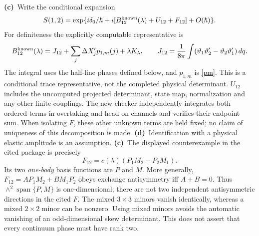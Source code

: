 \documentclass[11pt,a4paper]{article}
\newcommand{\C}{\textbf{(c)}\ }
\newcommand{\D}{\textbf{(d)}\ }
\begin{document}
\C Write the conditional expansion
\begin{equation}
 S(1,2)=\exp\{i\delta_0/\hbar+i[B_{12}^{\rm known}(\lambda)
                      +U_{12}+F_{12}]+O(\hbar)\}.\label{S}
\end{equation}
For definiteness the explicitly computable representative is
\begin{equation}
 B_{12}^{\rm known}(\lambda)=J_{12}
             +\sum_j\Delta X'_j p_{1,m}(j)+\lambda K_\lambda,\qquad
 J_{12}=\frac1{8\pi}\int(\vartheta_1\vartheta'_2-
                             \vartheta_2\vartheta'_1)\,dq.\label{knownbulk}
\end{equation}
The integral uses the half-line phases defined below, and $p_{1,m}$ is
\eqref{pm}. This is a conditional trace representative, not the completed
physical determinant. $U_{12}$ includes the uncomputed projected determinant,
state map, normalization and any other finite couplings. The new checker
independently integrates both ordered terms in overtaking and head-on
channels and verifies their endpoint sum. When isolating $F$, these other
unknown terms are held fixed; no claim of uniqueness of this decomposition
is made.
\D Identification with a physical elastic amplitude is an assumption.
\C The displayed counterexample in the cited package is precisely
\begin{equation}
 F_{12}=c(\lambda)(P_1M_2-P_2M_1).\label{F}
\end{equation}
Its two \emph{one-body} basis functions are $P$ and $M$. More generally,
$F_{12}=A P_1M_2+B M_1P_2$ obeys exchange antisymmetry iff $A+B=0$.
Thus $\wedge^2\operatorname{span}\{P,M\}$ is one-dimensional; there are
not two independent antisymmetric directions in the cited $F$.
The mixed $3\times3$ minors vanish identically, whereas a mixed $2\times2$
minor can be nonzero. Using mixed minors avoids the automatic vanishing
of an odd-dimensional skew determinant. This does not assert that every
continuum phase must have rank two.
\end{document}
